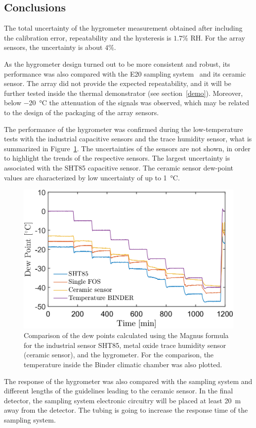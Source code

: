 \subsection{Conclusions}
The total uncertainty of the hygrometer measurement obtained after including the calibration error, repeatability and the hysteresis is $1.7$\% RH. For the array sensors, the uncertainty is about $4\%$.


As the hygrometer design turned out to be more consistent and robust, its performance was also compared with the E20 sampling system~\cite{michell_e20} and its ceramic sensor. The array did not provide the expected repeatability, and it  will be further tested inside the thermal demonstrator (see section~\ref{demo}). Moreover, below \SI{-20}{\celsius} the attenuation of the signals was observed, which may be related to the design of the packaging of the array sensors.

The performance of the hygrometer was confirmed during the low-temperature tests with the industrial capacitive sensors and the trace humidity sensor, what is summarized in Figure~\ref{fig_comparison}. The uncertainties of the sensors are not shown, in order to highlight the trends of the respective sensors. The largest uncertainty is associated with the SHT85 capacitive sensor. The ceramic sensor dew-point values are characterized by low uncertainty of up to \SI{1}{\celsius}.  
\begin{figure}[!h]
\centering
\includegraphics[width=0.6\columnwidth]{Chapter5/images/DPCPercent.png}
\caption{Comparison of the dew points calculated using the Magnus formula for the industrial sensor SHT85, metal oxide trace humidity sensor (ceramic sensor), and the hygrometer. For the comparison, the temperature inside the Binder climatic chamber was also plotted.}
\label{fig_comparison}
\end{figure}

The response of the hygrometer was also compared with the sampling system and different lengths of the guidelines leading to the ceramic sensor. In the final detector, the sampling system electronic circuitry will be placed at least \SI{20}{\metre} away from the detector. The tubing is going to increase the response time of the sampling system. 

